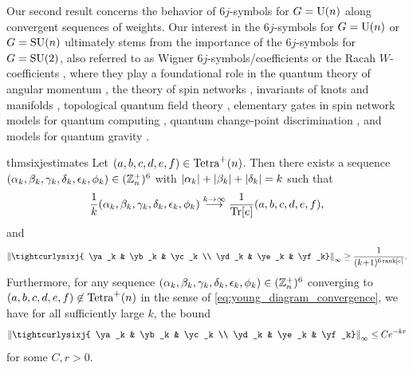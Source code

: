 \documentclass[notitlepage, 11pt, letterpaper]{amsart}
\begin{document}
Our second result concerns the behavior of $6j$-symbols for $G=\operatorname{U}(n)$ along convergent sequences of weights.
Our interest in the $6j$-symbols for $G=\operatorname{U}(n)$ or $G=\operatorname{SU}(n)$ ultimately stems from the importance of the $6j$-symbols for $G=\operatorname{SU}(2)$, also referred to as Wigner $6j$-symbols/coefficients \cite{wigner1993matrices} or the Racah $W$-coefficients \cite{racah1942theory},
where they play a foundational role in the quantum theory of angular momentum \cite{varshalovich1988quantum,edmonds1996angular,aquilanti2012semiclassical}, the theory of spin networks \cite{penrose1971applications, baez2010physics, baez1996spin}, invariants of knots and manifolds \cite{reshetikhin1987quantized, turaev1992state}, topological quantum field theory \cite{durhuus1993topological}, elementary gates in spin network models for quantum computing \cite{marzuoli2005computing}, quantum change-point discrimination \cite{akimoto2011discrimination}, and models for quantum gravity \cite{baez1999introduction,barrett1998relativistic,barrett2003geometrical,rovelli2004quantum,moussouris1984quantum}.
\begin{restatable}{thm}{sixjestimates}
    \label{thm:6j_estimates}
    Let $(a, b, c, d, e, f) \in \operatorname{Tetra}^+(n)$.
    Then there exists a sequence
    $(\alpha_k, \beta_k, \gamma_k, \delta_k, \epsilon_k, \phi_k) \in (\mathbb Z^{+}_{n})^6$ with $\left|\alpha_k\right|+\left|\beta_k\right|+\left|\delta_k\right| = k$ such that
    \begin{equation}
        \label{eq:young_diagram_convergence}
        \frac{1}{k} (\alpha_k, \beta_k, \gamma_k, \delta_k, \epsilon_k, \phi_k)
        \stackrel{k \to \infty}{\longrightarrow}
        \frac{1}{\operatorname{Tr}[e]} (a, b, c, d, e, f),
    \end{equation}
    and
    \begin{equation}
        \label{eq:n_independent_inverse_poly}
        \norm{\tightcurlysixj{ \ya_k & \yb_k & \yc_k \\ \yd_k &  \ye_k &  \yf_k}}_{\infty} \geq \frac{1}{\polyk{6\rank[\ee]}}.
    \end{equation}
    Furthermore, for any sequence $(\alpha_k, \beta_k, \gamma_k, \delta_k, \epsilon_k, \phi_k) \in (\mathbb Z^{+}_{n})^6$ converging to $(a, b, c, d, e, f) \not \in \operatorname{Tetra}^{+}(n)$ in the sense of \cref{eq:young_diagram_convergence}, we have for all sufficiently large $k$, the bound
    \begin{equation}
        \norm{\tightcurlysixj{ \ya_k & \yb_k & \yc_k \\ \yd_k &  \ye_k &  \yf_k}}_{\infty} \leq C e^{-kr}
    \end{equation}
    for some $C, r > 0$.
\end{restatable}
\end{document}
